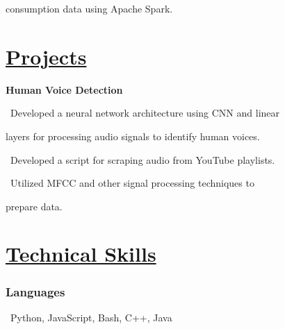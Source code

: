 \documentclass{article}
\begin{document}
\begin{minipage}[t][0pt]{8in\linewidth}
\begin{minipage}[t]{0.45\textwidth\hspace{0in}}
\begin{minipage}[t]{3.75in\textwidth\hspace{0in}}
            \hspace{1.6em} consumption data using Apache Spark.
        \end{minipage}

        \section{\underline{Projects}}
        \begin{minipage}[t]{3.75in\textwidth\hspace{0in}}
            \mdseries\bfseries{Human Voice Detection}            
            
            \vspace{0.6em}
            \small\mdseries
            \hspace{1em}\textasteriskcentered \, \mdseries\textrm{Developed a neural network architecture using CNN and linear} 
            
            \hspace{2em}layers for processing audio signals to identify human voices.

            \vspace{0.6em}
            \hspace{1em}\textasteriskcentered \, \mdseries\textrm{Developed a script for scraping audio from YouTube playlists.}
            
            \vspace{0.6em}
            \hspace{1em}\textasteriskcentered \, \mdseries\textrm{Utilized MFCC and other signal processing techniques to} 
            
            \hspace{1.7em} prepare data.

        \end{minipage}

\end{minipage}
    \begin{minipage}[t]{3.1in\linewidth\hspace{2.8em}}
    \section{\underline{Technical Skills}}
    \vspace{-0.7em}
    \subsubsection{Languages}
    \, Python, JavaScript, Bash, C++, Java
    \vspace{0.3em}


\end{minipage}
\end{minipage}
\end{document}
